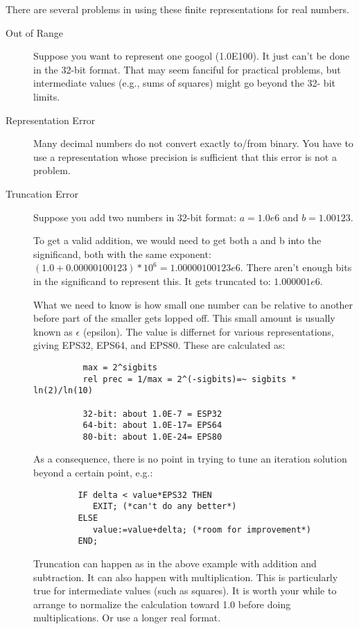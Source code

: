 There are several problems in using these finite
representations for real numbers.
\begin{description}
\item[Out of Range]
     Suppose you want to represent one googol (1.0E100).  It
     just can't be done in the 32-bit format.  That may seem
     fanciful for practical problems, but intermediate
     values (e.g., sums of squares) might go beyond the 32-
     bit limits.

\item[Representation Error]
     Many decimal numbers do not convert exactly to/from
     binary.  You have to use a representation whose
     precision is sufficient that this error is not a
     problem.

\item[Truncation Error]
     Suppose you add two numbers in 32-bit format: $a=1.0e6$ and $b=1.00123$.
     
     To get a valid addition, we would need to get both a
     and b into the significand, both with the same
     exponent: $(1.0+0.00000100123)*10^6 = 1.00000100123e6$.
     There aren't enough bits in the significand to
     represent this.  It gets truncated to: $1.000001e6$.
     
     What we need to know is how small one number can be
     relative to another before part of the smaller gets
     lopped off.  This small amount is usually known as
     $\epsilon$ (epsilon).  The value is differnet for various
     representations, giving EPS32, EPS64, and EPS80.
     These are calculated as:
     \begin{verbatim}
          max = 2^sigbits
          rel prec = 1/max = 2^(-sigbits)=~ sigbits * ln(2)/ln(10)
          
          32-bit: about 1.0E-7 = ESP32
          64-bit: about 1.0E-17= EPS64
          80-bit: about 1.0E-24= EPS80
     \end{verbatim}
     
     As a consequence, there is no point in trying to tune
     an iteration solution beyond a certain point, e.g.:
     \begin{tt} \begin{verbatim}
         IF delta < value*EPS32 THEN
            EXIT; (*can't do any better*)
         ELSE
            value:=value+delta; (*room for improvement*)
         END;
     \end{verbatim} \end{tt}
     
     Truncation can happen as in the above example with
     addition and subtraction.  It can also happen with
     multiplication.  This is particularly true for
     intermediate values (such as squares).  It is worth
     your while to arrange to normalize the calculation
     toward 1.0 before doing multiplications.  Or use a
     longer real format.


\end{description}

